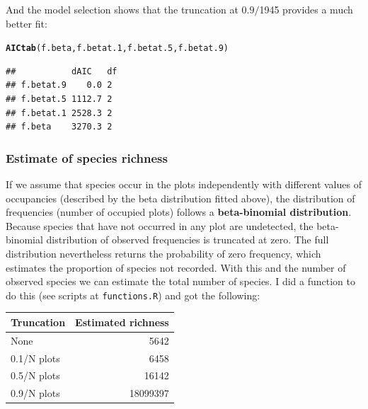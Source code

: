 \documentclass[12pt, A4]{article}\usepackage[]{graphicx}\usepackage[]{color}
\makeatletter
\newcommand{\hlstd}[1]{\textcolor[rgb]{0.345,0.345,0.345}{#1}}%
\newcommand{\hlkwd}[1]{\textcolor[rgb]{0.737,0.353,0.396}{\textbf{#1}}}%
\newenvironment{kframe}{%
 \def\at@end@of@kframe{}%
 \ifinner\ifhmode%
  \def\at@end@of@kframe{\end{minipage}}%
  \begin{minipage}{\columnwidth}%
 \fi\fi%
 \def\FrameCommand##1{\hskip\@totalleftmargin \hskip-\fboxsep
 \colorbox{shadecolor}{##1}\hskip-\fboxsep
     \hskip-\linewidth \hskip-\@totalleftmargin \hskip\columnwidth}%
 \MakeFramed {\advance\hsize-\width
   \@totalleftmargin\z@ \linewidth\hsize
   \@setminipage}}%
 {\par\unskip\endMakeFramed%
 \at@end@of@kframe}
\newenvironment{knitrout}{}{} %
\makeatother
\begin{document}
And the model selection shows that the truncation at $0.9/$1945
provides a much better fit:

\begin{knitrout}
\color{fgcolor}\begin{kframe}
\begin{alltt}
\hlkwd{AICtab}\hlstd{(f.beta, f.betat.1, f.betat.5, f.betat.9)}
\end{alltt}
\begin{verbatim}
##           dAIC   df
## f.betat.9    0.0 2 
## f.betat.5 1112.7 2 
## f.betat.1 2528.3 2 
## f.beta    3270.3 2
\end{verbatim}
\end{kframe}
\end{knitrout}

\subsubsection*{Estimate of species richness}



If we assume that species occur in the plots
independently with different values of occupancies
(described by the beta distribution fitted above),
the distribution of frequencies (number of occupied plots) 
follows a \textbf{beta-binomial distribution}. Because species that
have not occurred in any plot are undetected, 
the beta-binomial distribution
of observed frequencies is truncated at zero. 
The full distribution nevertheless returns the probability
of zero frequency, which estimates the proportion of species
not recorded. With this and the number of observed species we
can estimate the total number of species. I did a function
to do this (see scripts at \texttt{functions.R}) and
got the following:

\begin{knitrout}
\color{fgcolor}
\begin{tabular}{l|r}
\hline
Truncation & Estimated richness\\
\hline
None & 5642\\
\hline
0.1/N plots & 6458\\
\hline
0.5/N plots & 16142\\
\hline
0.9/N plots & 18099397\\
\hline
\end{tabular}


\end{knitrout}
\end{document}
